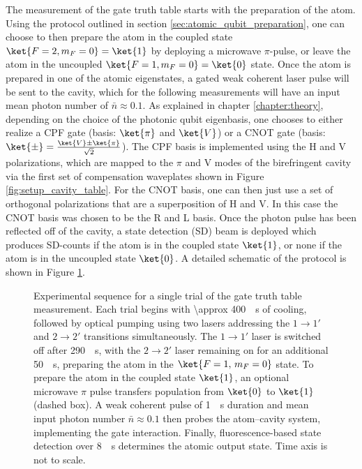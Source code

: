 The measurement of the gate truth table starts with the preparation of the atom. Using the protocol outlined in section \ref{sec:atomic_qubit_preparation}, one can choose to then prepare the atom in the coupled state $\ket{F=2,m_F=0}=\ket{1}$ by deploying a microwave $\pi$-pulse, or leave the atom in the uncoupled $\ket{F=1,m_F=0}=\ket{0}$ state. Once the atom is prepared in one of the atomic eigenstates, a gated weak coherent laser pulse will be sent to the cavity, which for the following measurements will have an input mean photon number of $\bar{n}\approx0.1$. As explained in chapter \ref{chapter:theory}, depending on the choice of the photonic qubit eigenbasis, one chooses to either realize a CPF gate (basis: $\ket{\pi}$ and $\ket{V}$) or a CNOT gate (basis: $\ket{\pm}=\frac{\ket{V}\pm{\ket{\pi}}}{\sqrt{2}}$). The CPF basis is implemented using the H and V polarizations, which are mapped to the $\pi$ and V modes of the birefringent cavity via the first set of compensation waveplates shown in Figure \ref{fig:setup_cavity_table}. For the CNOT basis, one can then just use a set of orthogonal polarizations that are a superposition of H and V. In this case the CNOT basis was chosen to be the R and L basis. Once the photon pulse has been reflected off of the cavity, a state detection (SD) beam is deployed which produces SD-counts if the atom is in the coupled state $\ket{1}$, or none if the atom is in the uncoupled state $\ket{0}$. A detailed schematic of the protocol is shown in Figure \ref{fig:experimental_protocol}.

\begin{figure}[htbp]
	\centering
	
	\caption{Experimental sequence for a single trial of the gate truth table measurement. Each trial begins with \SI{\approx 400}{\mu\second} of cooling, followed by optical pumping using two lasers addressing the $1 \to 1'$ and $2 \to 2'$ transitions simultaneously. The $1 \to 1'$ laser is switched off after \SI{290}{\mu\second}, with the $2 \to 2'$ laser remaining on for an additional \SI{50}{\mu\second}, preparing the atom in the $\ket{F=1,\, m_F=0}$ state. To prepare the atom in the coupled state $\ket{1}$, an optional microwave $\pi$ pulse transfers population from $\ket{0}$ to $\ket{1}$ (dashed box). A weak coherent pulse of \SI{1}{\mu\second} duration and mean input photon number $\bar{n}\approx0.1$ then probes the atom--cavity system, implementing the gate interaction. Finally, fluorescence-based state detection over \SI{8}{\mu\second} determines the atomic output state. Time axis is not to scale.}
	\label{fig:experimental_protocol}
\end{figure}


